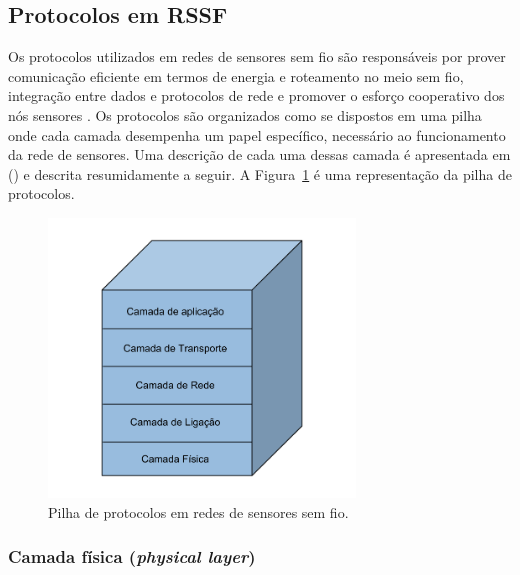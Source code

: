 \subsection{Protocolos em RSSF} 

Os protocolos utilizados em redes de sensores sem fio são responsáveis por prover comunicação eficiente em termos de energia e roteamento no meio sem fio, integração entre dados e protocolos de rede e promover o esforço cooperativo dos nós sensores \cite{Akyildiz2002}. Os protocolos são organizados como se dispostos em uma pilha onde cada camada desempenha um papel específico, necessário ao funcionamento da rede de sensores. Uma descrição de cada uma dessas camada é apresentada em  (\citeyear{Akyildiz2002}) e descrita resumidamente a seguir. A Figura~\ref{fig:protocolStack} é uma representação da pilha de protocolos.

\begin{figure}[!htb]
\centering
\includegraphics[width=308px,height=280px]{./Pictures/ProtocolStack.png}
\caption{Pilha de protocolos em redes de sensores sem fio.} %
\label{fig:protocolStack} %
\end{figure}


 \subsubsection{Camada física (\textit{physical layer})} 


